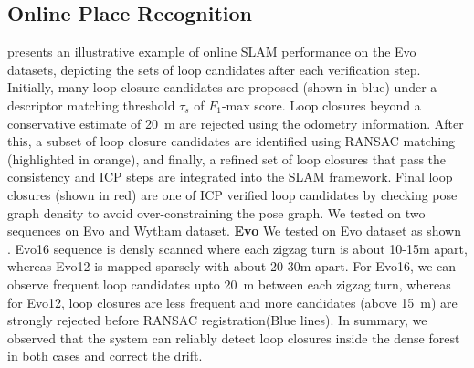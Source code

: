 \subsection*{Online Place Recognition}
 presents an illustrative example of online SLAM performance on the Evo datasets, depicting the sets of loop candidates after each verification step. Initially, many loop closure candidates are proposed (shown in blue) under a descriptor matching threshold $\tau_{s}$ of $F_1$-max score. Loop closures beyond a conservative estimate of \SI{20}{\meter} are rejected using the odometry information. After this, a subset of loop closure candidates are identified using RANSAC matching (highlighted in orange), and finally, a refined set of loop closures that pass the consistency and ICP steps are integrated into the SLAM framework. Final loop closures (shown in red) are one of ICP verified loop candidates by checking pose graph density to avoid over-constraining the pose graph. We tested on two sequences on Evo and Wytham dataset. 
\newline
\textbf{Evo}\hspace{0.5em} We tested on Evo dataset as shown . Evo16 sequence is densly scanned where each zigzag turn is about 10-15m apart, whereas Evo12 is mapped sparsely with about 20-30m apart. For Evo16, we can observe frequent loop candidates upto \SI{20}{\meter} between each zigzag turn, whereas for Evo12, loop closures are less frequent and more candidates (above \SI{15}{\meter}) are strongly rejected before RANSAC registration(Blue lines). In summary, we observed that the system can reliably detect loop closures inside the dense forest in both cases and correct the drift. 
